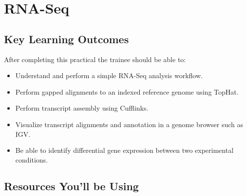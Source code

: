 \renewcommand{\moduleTitle}{RNA-Seq}
\renewcommand{\moduleAuthors}{%
  Myrto Kostadima, EMBL-EBI \mailto{kostadmi@ebi.ac.uk}\\
  Remco Loos, EMBL-EBI \mailto{remco@ebi.ac.uk}
} \renewcommand{\moduleContributions}{%
  Nathan S. Watson-Haigh \mailto{nathan.watson-haigh@awri.com.au}%
}

\chapter{\moduleTitle}
\newpage

\section{Key Learning Outcomes}

After completing this practical the trainee should be able to:
% 
\begin{itemize}
  \item Understand and perform a simple RNA-Seq analysis workflow.
  \item Perform gapped alignments to an indexed reference genome using TopHat.
  \item Perform transcript assembly using Cufflinks.
  \item Visualize transcript alignments and annotation in a genome browser such as IGV.
  \item Be able to identify differential gene expression between two experimental conditions.
\end{itemize}

\section{Resources You'll be Using}
 
